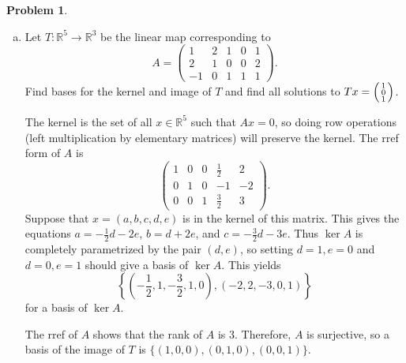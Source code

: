 \documentclass[11pt,oneside]{amsart}
\theoremstyle{definition}
\newtheorem{problem}{Problem}
\newcommand{\bR}{\mathbb{R}}
\newcommand*\colvec[1]{\begin{psmallmatrix}#1\end{psmallmatrix}}
\begin{document}
    \begin{problem}
        \leavevmode\begin{enumerate}[(a)]
            \item Let $T\colon\bR^5\to\bR^3$ be the linear map corresponding to
        \[A=\begin{pmatrix}1&2&1&0&1\\2&1&0&0&2\\-1&0&1&1&1\end{pmatrix}.\]
        Find bases for the kernel and image of $T$ and find all solutions to $Tx=\colvec{1\\0\\1}$.
        \begin{solution}
            The kernel is the set of all $x\in\bR^5$ such that $Ax=0$, so doing row operations (left multiplication by elementary matrices) will preserve the kernel. The rref form of $A$ is
            \[\begin{pmatrix}
                1&0&0&\frac12&2\\
                0&1&0&-1&-2\\
                0&0&1&\frac32&3
            \end{pmatrix}.\]
            Suppose that $x=(a,b,c,d,e)$ is in the kernel of this matrix. This gives the equations $a=-\frac 12d-2e$, $b=d+2e$, and $c=-\frac 32d-3e$. Thus $\ker A$ is completely parametrized by the pair $(d,e)$, so setting $d=1,e=0$ and $d=0,e=1$ should give a basis of $\ker A$. This yields
            \[\left\{\left(-\frac 12,1,-\frac 32,1,0\right),\left(-2,2,-3,0,1\right)\right\}\]
            for a basis of $\ker A$.

            The rref of $A$ shows that the rank of $A$ is 3. Therefore, $A$ is surjective, so a basis of the image of $T$ is $\{(1,0,0),(0,1,0),(0,0,1)\}$.


\end{solution}
\end{enumerate}
\end{problem}
\end{document}
